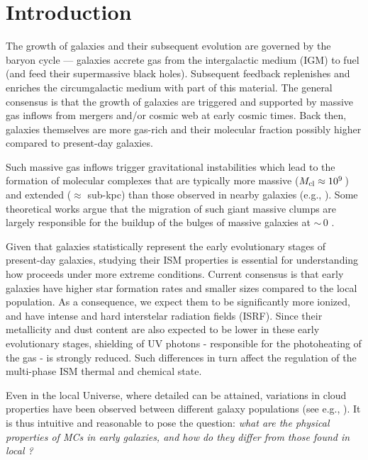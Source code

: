 \IfFileExists{emulateapjlegacy.cls}{\documentclass[iop]{emulateapjlegacy}}{\documentclass[iop]{emulateapj}}
\begin{document}

\section{Introduction}
The growth of galaxies and their subsequent evolution are governed by the baryon cycle --- galaxies accrete gas from the intergalactic medium (IGM) to fuel \SF (and feed their supermassive black holes). Subsequent feedback replenishes and enriches the circumgalactic medium with part of this material. The general consensus is that the growth of \highz galaxies are triggered and supported by massive gas inflows from mergers and/or cosmic web at early cosmic times. Back then, galaxies themselves are more gas-rich and their molecular fraction possibly higher compared to present-day galaxies.

Such massive gas inflows trigger gravitational instabilities which lead to the formation of molecular complexes that are typically more massive ($M_{\rm cl}\approx 10^9$\,\Msun) and extended ($\approx$ sub-kpc) than those observed in nearby galaxies (e.g., \citealt{Gabor13a, Hopkins14a, Inoue16a}).
%
Some theoretical works argue that the migration of such giant massive clumps are largely responsible for the buildup of the bulges of massive galaxies at \z$\sim$\,0 \citep[e.g.,][]{Ceverino10a}.

Given that \highz galaxies statistically represent  the early evolutionary stages of present-day galaxies, studying their ISM properties is essential for understanding how \SF proceeds under more extreme conditions. Current consensus is that early galaxies have higher star formation rates \citep[SFR; ][]{Behroozi13b, Sparre15a, Maiolino15a, Dunlop17a} and smaller sizes \citep[e.g.,][]{Bouwens11a, Ono13a} compared to the local population.
%
As a consequence, we expect them to be significantly more ionized, and have intense and hard interstelar radiation fields (ISRF). Since their metallicity and dust content are also expected to be lower in these early evolutionary stages, shielding of UV photons - responsible for the photoheating of the gas - is strongly reduced. Such differences in turn affect the regulation of the multi-phase ISM thermal and chemical state.

Even in the local Universe, where detailed \obs can be attained, variations in cloud properties have been observed between different galaxy populations (see e.g., \citealt{Hughes10a, Hughes13b}). It is thus intuitive and reasonable to pose the question: {\it what are the physical properties of MCs in early galaxies, and how do they differ from those found in local \galpop?}
%
\end{document}
